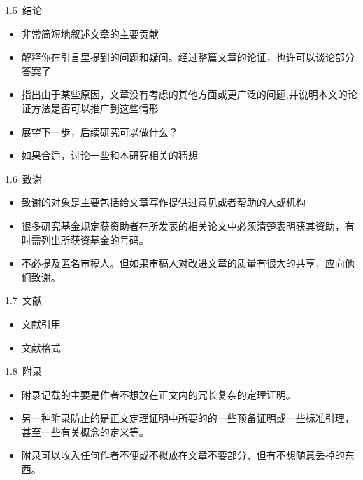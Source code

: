 \documentclass[13pt]{ctexbeamer}
\begin{document}
\begin{frame}{1.5~结论}
	
	\begin{itemize}
		\item  非常简短地叙述文章的主要贡献
		\item  解释你在引言里提到的问题和疑问。经过整篇文章的论证，也许可以谈论部分答案了
		\item 指出由于某些原因，文章没有考虑的其他方面或更广泛的问题,并说明本文的论证方法是否可以推广到这些情形
		\item  展望下一步，后续研究可以做什么？
		\item 如果合适，讨论一些和本研究相关的猜想
	\end{itemize}
\end{frame}


\begin{frame}{1.6~致谢}
	
	\begin{itemize}
		\item  致谢的对象是主要包括给文章写作提供过意见或者帮助的人或机构
		\item  很多研究基金规定获资助者在所发表的\alert{相关}论文中必须清楚表明获其资助，有时需列出所获资基金的号码。
		\item 不必提及匿名审稿人。但如果审稿人对改进文章的质量有很大的共享，应向他们致谢。
	\end{itemize}
\end{frame}


\begin{frame}{1.7~文献}
	
	\begin{itemize}
		\item  文献引用
		\item  文献格式
	\end{itemize}
\end{frame}


\begin{frame}{1.8~附录}
	
	\begin{itemize}
		\item  附录记载的主要是作者不想放在正文内的冗长复杂的定理证明。
		\item  另一种附录防止的是正文定理证明中所要的的一些预备证明或一些标准引理，甚至一些有关概念的定义等。
		\item 附录可以收入任何作者不便或不拟放在文章不要部分、但有不想随意丢掉的东西。
	\end{itemize}
\end{frame}
\end{document}
